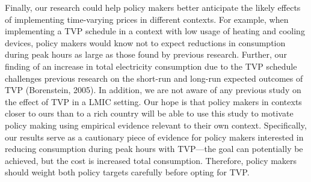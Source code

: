 \documentclass[12pt]{article}
\begin{document}
Finally, our research could help policy makers better anticipate the likely effects of implementing time-varying prices in different contexts. For example, when implementing a TVP schedule in a context with low usage of heating and cooling devices, policy makers would know not to expect reductions in consumption during peak hours as large as those found by previous research. Further, our finding of an increase in total electricity consumption due to the TVP schedule challenges previous research on the short-run and long-run expected outcomes of TVP (Borenstein, 2005). In addition, we are not aware of any previous study on the effect of TVP in a LMIC setting. Our hope is that policy makers in contexts closer to ours than to a rich country will be able to use this study to motivate policy making using empirical evidence relevant to their own context. Specifically, our results serve as a cautionary piece of evidence for policy makers interested in reducing consumption during peak hours with TVP---the goal can potentially be achieved, but the cost is increased total consumption. Therefore, policy makers should weight both policy targets carefully before opting for TVP.

\clearpage




\clearpage


%
% 
%
\end{document}
